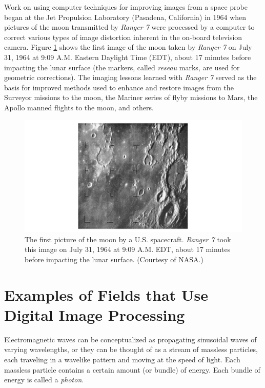 \documentclass[a4paper,10pt,twoside]{book}
\begin{document}
Work on using computer techniques for improving images from a space probe began at the Jet Propulsion Laboratory (Pasadena, California) in 1964 when pictures of the moon transmitted by \textit{Ranger 7} were processed by a computer to correct various types of image distortion inherent in the on-board television camera. Figure \ref{Figure:1.4} shows the first image of the moon taken by \textit{Ranger 7} on July 31, 1964 at 9:09 {\footnotesize A.M.} Eastern Daylight Time (EDT), about 17 minutes before impacting the lunar surface (the markers, called \textit{reseau} marks, are used for geometric corrections). The imaging lessons learned with \textit{Ranger 7} served as the basis for improved methods used to enhance and restore images from the Surveyor missions to the moon, the Mariner series of flyby missions to Mars, the Apollo manned flights to the moon, and others.

\begin{figure}[htbp]
    \centering
    \includegraphics[width=\linewidth]{Figure1 4.png}
    \caption{The first picture of the moon by a U.S. spacecraft. \textit{Ranger 7} took this image on July 31, 1964 at 9:09 {\footnotesize A.M.} EDT, about 17 minutes before impacting the lunar surface. (Courtesy of NASA.)}
    \label{Figure:1.4}
\end{figure}

\section{Examples of Fields that Use Digital Image Processing}

Electromagnetic waves can be conceptualized as propagating sinusoidal waves of varying wavelengths, or they can be thought of as a stream of massless particles, each traveling in a wavelike pattern and moving at the speed of light. Each massless particle contains a certain amount (or bundle) of energy. Each bundle of energy is called a \textit{photon}.
\end{document}
